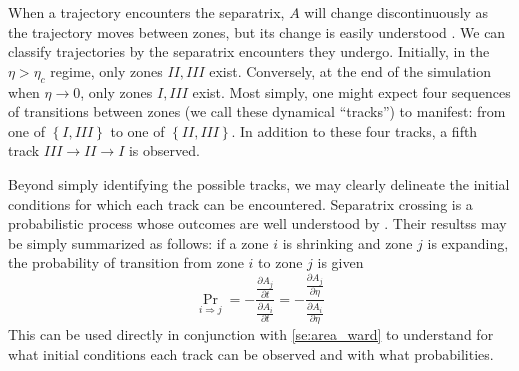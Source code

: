 \documentclass[
        fleqn,
        usenatbib,
    ]{mnras}
\newcommand*{\pd}[2]{\frac{\partial#1}{\partial#2}}
\newcommand*{\z}[1]{\left\{#1\right\}}
\begin{document}
When a trajectory encounters the separatrix, $A$ will change discontinuously as
the trajectory moves between zones, but its change is easily understood
\citep{henrard1982}. We can classify trajectories by the separatrix encounters
they undergo. Initially, in the $\eta > \eta_c$ regime, only zones $II, III$
exist. Conversely, at the end of the simulation when $\eta \to 0$, only zones
$I, III$ exist. Most simply, one might expect four sequences of transitions
between zones (we call these dynamical ``tracks'') to manifest: from one of
$\z{I, III}$ to one of $\z{II, III}$. In addition to these four tracks, a
fifth track $III \to II \to I$ is observed.

Beyond simply identifying the possible tracks, we may clearly delineate the
initial conditions for which each track can be encountered. Separatrix crossing
is a probabilistic process whose outcomes are well understood by
\citealp{henrard1982,henrard1987}. Their resultss may be simply summarized as
follows: if a zone $i$ is shrinking and zone $j$ is expanding, the probability
of transition from zone $i$ to zone $j$ is given
\begin{equation}
    \Pr_{i \Rightarrow j} = -\frac{\pd{A_j}{t}}{ \pd{A_i}{t}}
        = -\frac{\pd{A_j}{\eta}}{ \pd{A_i}{\eta}}\label{eq:henrard_hop}
\end{equation}
This can be used directly in conjunction with \autoref{se:area_ward} to
understand for what initial conditions each track can be observed and with what
probabilities.
\end{document}
